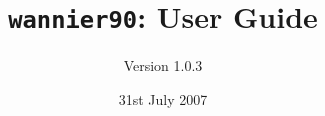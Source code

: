 \documentclass[a4paper,11pt,twoside]{book}
\title{{\tt wannier90}: User Guide}
\author{Version 1.0.3}
\date{31st July 2007}
\begin{document}
\newcommand{\wannier}{\texttt{wannier90}}
\newcommand{\pwscf}{\textsc{pwscf}}
\newcommand{\QE}{\textsc{quantum-espresso}}
\newcommand{\Mkb}{\mathbf{M}^{(\mathbf{k},\mathbf{b})}}
\newcommand{\Ak}{\mathbf{A}^{(\mathbf{k})}}
\newcommand{\Uk}{\mathbf{U}^{(\mathbf{k})}}
\newcommand{\cond}{\item[$\star$]}
\newcommand{\omi}{\Omega_{\mathrm{I}}}
\newcommand{\omt}{\widetilde{\Omega}}


\maketitle






















%
\end{document}
